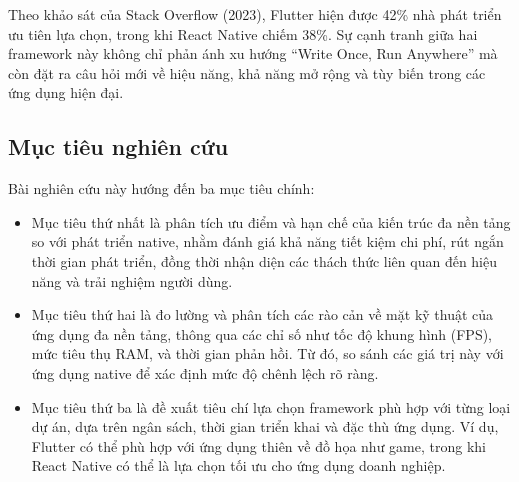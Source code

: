 \begin{flushleft}
    \hspace*{0.8cm}Theo khảo sát của Stack Overflow (2023), Flutter hiện được 42\% nhà phát triển ưu tiên lựa chọn, trong khi React Native chiếm 38\%. Sự cạnh tranh giữa hai framework này không chỉ phản ánh xu hướng ``Write Once, Run Anywhere'' mà còn đặt ra câu hỏi mới về hiệu năng, khả năng mở rộng và tùy biến trong các ứng dụng hiện đại.
\end{flushleft}


% 
\subsection{Mục tiêu nghiên cứu}
\renewcommand{\labelitemi}{--}    
\begin{flushleft}
    \hspace*{0.8cm}Bài nghiên cứu này hướng đến ba mục tiêu chính:
    \setlength{\leftmargini}{1.0cm}
    \begin{itemize}
        \item Mục tiêu thứ nhất là phân tích ưu điểm và hạn chế của kiến trúc đa nền tảng so với phát triển native, nhằm đánh giá khả năng tiết kiệm chi phí, rút ngắn thời gian phát triển, đồng thời nhận diện các thách thức liên quan đến hiệu năng và trải nghiệm người dùng.
        
        \item Mục tiêu thứ hai là đo lường và phân tích các rào cản về mặt kỹ thuật của ứng dụng đa nền tảng, thông qua các chỉ số như tốc độ khung hình (FPS), mức tiêu thụ RAM, và thời gian phản hồi. Từ đó, so sánh các giá trị này với ứng dụng native để xác định mức độ chênh lệch rõ ràng.
        
        \item Mục tiêu thứ ba là đề xuất tiêu chí lựa chọn framework phù hợp với từng loại dự án, dựa trên ngân sách, thời gian triển khai và đặc thù ứng dụng. Ví dụ, Flutter có thể phù hợp với ứng dụng thiên về đồ họa như game, trong khi React Native có thể là lựa chọn tối ưu cho ứng dụng doanh nghiệp.
    \end{itemize}
\end{flushleft}

